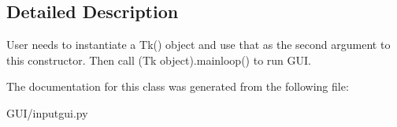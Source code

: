 \subsection{Detailed Description}
\begin{DoxyVerb}User needs to instantiate a Tk() object and use that as the second argument to this constructor. Then call
    (Tk object).mainloop() to run GUI.\end{DoxyVerb}
 

The documentation for this class was generated from the following file\+:\begin{DoxyCompactItemize}
\item 
G\+U\+I/inputgui.\+py\end{DoxyCompactItemize}
